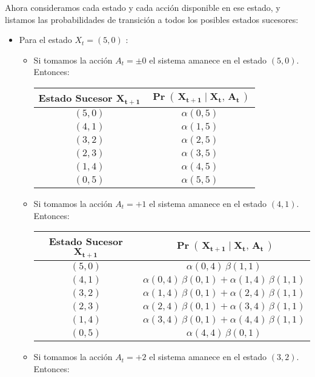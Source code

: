 \documentclass[ a4paper, twoside, 11pt]{article}
\begin{document}
\begin{problem}
Ahora consideramos cada estado y cada acci\'on disponible en ese estado, y listamos las probabilidades de transici\'on a todos los posibles estados sucesores: 
\begin{itemize}
\item Para el estado $X_t = (5,0)$ :
\begin{itemize}
\item Si tomamos la acci\'on $A_t = \pm 0$ el sistema amanece en el estado $(5,0)$. Entonces: 
\begin{table}[H]
\centering
\begin{tabular}{|c|c|}
\hline
\textbf{Estado Sucesor} $\boldsymbol{X_{t+1}}$
& $\boldsymbol{\Pr( \, X_{t+1} \mid X_t, \, A_t \, )}$ \\ \hline
$(5,0)$ & $\alpha(0,5)$ \\ \hline
$(4,1)$ & $\alpha(1,5)$ \\ \hline
$(3,2)$ & $\alpha(2,5)$ \\ \hline
$(2,3)$ & $\alpha(3,5)$ \\ \hline
$(1,4)$ & $\alpha(4,5)$ \\ \hline
$(0,5)$ & $\alpha(5,5)$ \\ \hline
\end{tabular}
\end{table}
\item Si tomamos la acci\'on $A_t = +1$ el sistema amanece en el estado $(4,1)$. Entonces: 
\begin{table}[H]
\centering
\begin{tabular}{|c|c|}
\hline
\textbf{Estado Sucesor} $\boldsymbol{X_{t+1}}$
& $\boldsymbol{\Pr( \, X_{t+1} \mid X_t, \, A_t \, )}$ \\ \hline
$(5,0)$ & $\alpha(0,4) \, \beta(1,1)$ \\ \hline
$(4,1)$ & $\alpha(0,4) \, \beta(0,1) + \alpha(1,4) \, \beta(1,1)$ \\ \hline
$(3,2)$ & $\alpha(1,4) \, \beta(0,1) + \alpha(2,4) \, \beta(1,1)$ \\ \hline
$(2,3)$ & $\alpha(2,4) \, \beta(0,1) + \alpha(3,4) \, \beta(1,1)$ \\ \hline
$(1,4)$ & $\alpha(3,4) \, \beta(0,1) + \alpha(4,4) \, \beta(1,1)$ \\ \hline
$(0,5)$ & $\alpha(4,4) \, \beta(0,1)$ \\ \hline
\end{tabular}
\end{table}
\item Si tomamos la acci\'on $A_t = +2$ el sistema amanece en el estado $(3,2)$. Entonces: 

\end{itemize}
\end{itemize}
\end{problem}
\end{document}

